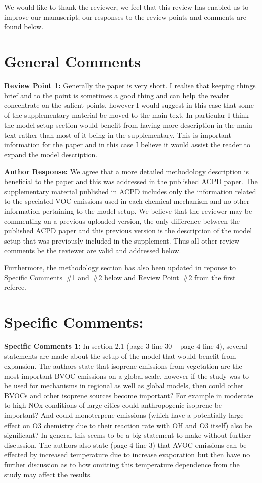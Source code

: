 \documentclass{article}
\begin{document}
We would like to thank the reviewer, we feel that this review has enabled us to improve our manuscript; our responses to the review points and comments are found below.

\section*{General Comments}

\textbf{Review Point 1:}  Generally the paper is very short. I realise that keeping things brief and to the point is sometimes a good thing and can help the reader concentrate on the salient points, however I would suggest in this case that some of the supplementary material be moved to the main text. In particular I think the model setup section would benefit from having more description in the main text rather than most of it being in the supplementary. This is important information for the paper and in this case I believe it would assist the reader to expand the model description.

\textbf{Author Response:} We agree that a more detailed methodology description is beneficial to the paper and this was addressed in the published ACPD paper. 
The supplementary material published in ACPD includes only the information related to the speciated VOC emissions used in each chemical mechanism and no other information pertaining to the model setup. 
We believe that the reviewer may be commenting on a previous uploaded version, the only difference between the published ACPD paper and this previous version is the description of the model setup that was previously included in the supplement.
Thus all other review comments be the reviewer are valid and addressed below. 

Furthermore, the methodology section has also been updated in reponse to Specific Comments~\#1 and~\#2 below and Review Point~\#2 from the first referee.

\section*{Specific Comments:}
\textbf{Specific Comments 1:}  In section 2.1 (page 3 line 30 – page 4 line 4), several statements are made about the setup of the model that would benefit from expansion. The authors state that isoprene emissions from vegetation are the most important BVOC emissions on a global scale, however if the study was to be used for mechanisms in regional as well as global models, then could other BVOCs and other isoprene sources become important? For example in moderate to high NOx conditions of large cities could anthropogenic isoprene be important? And could monoterpene emissions (which have a potentially large effect on O3 chemistry due to their reaction rate with OH and O3 itself) also be significant? In general this seems to be a big statement to make without further discussion. The authors also state (page 4 line 3) that AVOC emissions can be effected by increased temperature due to increase evaporation but then have no further discussion as to how omitting this temperature dependence from the study may affect the results.
\end{document}
